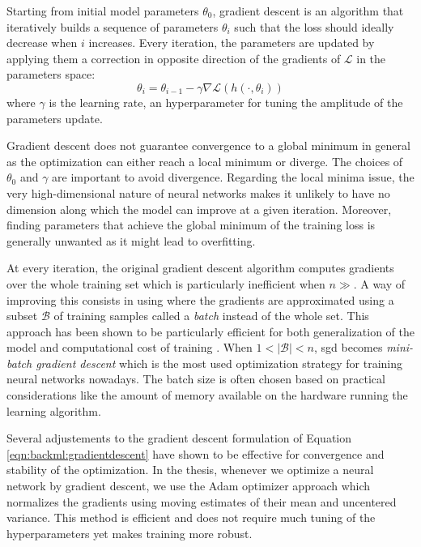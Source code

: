 Starting from initial model parameters $\theta_0$, gradient descent is an algorithm
that iteratively builds a sequence of parameters $\theta_i$ such that the loss
should ideally decrease when $i$ increases. Every iteration, the parameters are
updated by applying them a correction in opposite direction of the gradients of
$\mathcal{L}$ in the parameters space:
\begin{equation}
\label{eqn:backml:gradientdescent}
\theta_{i} = \theta_{i-1} - \gamma \nabla \mathcal{L}(h(\cdot, \theta_{i}))
\end{equation}
where $\gamma$ is the learning rate, an hyperparameter for tuning the amplitude
of the parameters update.

Gradient descent does not guarantee convergence to a global minimum in general as
the optimization can either reach a local minimum or diverge. The choices of
$\theta_0$ and $\gamma$ are important to avoid divergence. Regarding the local
minima issue, the very high-dimensional nature of neural networks makes it unlikely
to have no dimension along which the model can improve at a given iteration.
Moreover, finding parameters that achieve the global minimum of the training loss
is generally unwanted as it might lead to overfitting.

At every iteration, the original gradient descent algorithm computes gradients
over the whole training set which is particularly inefficient when $n \gg$. A
way of improving this consists in using  where the gradients are
approximated using a subset $\mathcal{B}$ of training samples called a \textit{batch}
instead of the whole set. This approach has been shown to be particularly efficient
for both generalization of the model and computational cost of training
\cite{bottou201113}. When $1 < |\mathcal{B}| < n$, \acrshort{sgd} becomes
\textit{mini-batch gradient descent} which is the most used optimization strategy
for training neural networks nowadays. The batch size is often chosen based on
practical considerations like the amount of memory available on the hardware
running the learning algorithm.

Several adjustements to the gradient descent formulation of Equation
\ref{eqn:backml:gradientdescent} have shown to be effective for convergence and
stability of the optimization. In the thesis, whenever we optimize a neural network
by gradient descent, we use the Adam optimizer \cite{kingma2014adam} approach
which normalizes the gradients using moving estimates of their mean and uncentered
variance. This method is efficient and does not require much tuning of the
hyperparameters yet makes training more robust.

